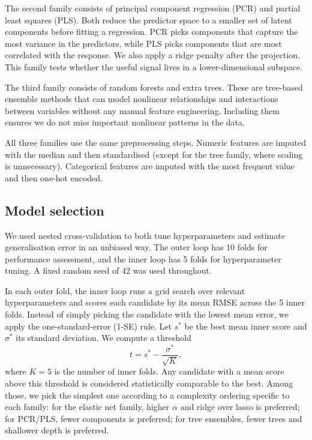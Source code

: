 \documentclass{article}
\begin{document}
The second family consists of principal component regression (PCR) and partial least squares (PLS). Both reduce the predictor space to a smaller set of latent components before fitting a regression. PCR picks components that capture the most variance in the predictors, while PLS picks components that are most correlated with the response. We also apply a ridge penalty after the projection. This family tests whether the useful signal lives in a lower-dimensional subspace.

The third family consists of random forests and extra trees. These are tree-based ensemble methods that can model nonlinear relationships and interactions between variables without any manual feature engineering. Including them ensures we do not miss important nonlinear patterns in the data.

All three families use the same preprocessing steps. Numeric features are imputed with the median and then standardised (except for the tree family, where scaling is unnecessary). Categorical features are imputed with the most frequent value and then one-hot encoded.

\subsection*{Model selection}

We used nested cross-validation to both tune hyperparameters and estimate generalisation error in an unbiased way. The outer loop has 10 folds for performance assessment, and the inner loop has 5 folds for hyperparameter tuning. A fixed random seed of 42 was used throughout.

In each outer fold, the inner loop runs a grid search over relevant hyperparameters and scores each candidate by its mean RMSE across the 5 inner folds. Instead of simply picking the candidate with the lowest mean error, we apply the one-standard-error (1-SE) rule. Let $s^{*}$ be the best mean inner score and $\sigma^{*}$ its standard deviation. We compute a threshold
\[
  t = s^{*} - \frac{\sigma^{*}}{\sqrt{K}},
\]
where $K = 5$ is the number of inner folds. Any candidate with a mean score above this threshold is considered statistically comparable to the best. Among those, we pick the simplest one according to a complexity ordering specific to each family: for the elastic net family, higher $\alpha$ and ridge over lasso is preferred; for PCR/PLS, fewer components is preferred; for tree ensembles, fewer trees and shallower depth is preferred.
\end{document}

